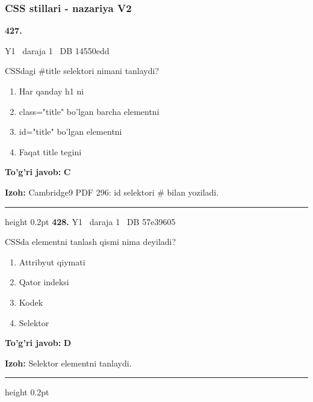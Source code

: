 \documentclass[10pt,a4paper,oneside]{article}
\begin{document}
\subsubsection{CSS stillari - nazariya V2}
\hypertarget{q427}{\textbf{\color{ink}427.}}  {\color{muted}\scriptsize Y1 \textbullet\ daraja 1 \textbullet\ DB 14550edd}
\par
CSSdagi \#title selektori nimani tanlaydi?
\begin{enumerate}[label=\Alph*),leftmargin=9mm]
\item Har qanday h1 ni
\item class="title" bo'lgan barcha elementni
\item id="title" bo'lgan elementni
\item Faqat title tegini
\end{enumerate}
\begin{tcolorbox}[enhanced,breakable,colback=teal!4,colframe=teal!45!black,boxrule=0.45pt,arc=1.2mm,left=2.8mm,right=2.8mm,top=2mm,bottom=2mm,before skip=2mm,after skip=2mm]
\textbf{\color{teal}To'g'ri javob:} \textbf{C}
\par\smallskip
\textbf{Izoh:} Cambridge9 PDF 296: id selektori \# bilan yoziladi.
\end{tcolorbox}
\vspace{2mm}\hrule height 0.2pt \vspace{4mm}
\hypertarget{q428}{\textbf{\color{ink}428.}}  {\color{muted}\scriptsize Y1 \textbullet\ daraja 1 \textbullet\ DB 57e39605}
\par
CSSda elementni tanlash qismi nima deyiladi?
\begin{enumerate}[label=\Alph*),leftmargin=9mm]
\item Attribyut qiymati
\item Qator indeksi
\item Kodek
\item Selektor
\end{enumerate}
\begin{tcolorbox}[enhanced,breakable,colback=teal!4,colframe=teal!45!black,boxrule=0.45pt,arc=1.2mm,left=2.8mm,right=2.8mm,top=2mm,bottom=2mm,before skip=2mm,after skip=2mm]
\textbf{\color{teal}To'g'ri javob:} \textbf{D}
\par\smallskip
\textbf{Izoh:} Selektor elementni tanlaydi.
\end{tcolorbox}
\vspace{2mm}\hrule height 0.2pt \vspace{4mm}
\end{document}
